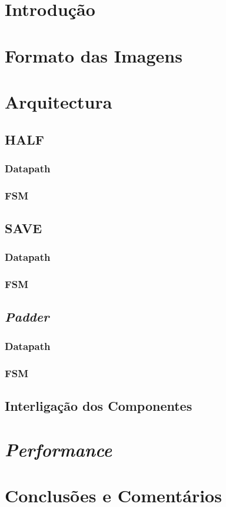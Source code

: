 \documentclass[a4paper]{article}
\begin{document}


\tableofcontents
\pagebreak

\section{Introdução}

\section{Formato das Imagens}

\section{Arquitectura}

\subsection{HALF}

\subsubsection{Datapath}

\subsubsection{FSM}

\subsection{SAVE}

\subsubsection{Datapath}

\subsubsection{FSM}

\subsection{\textit{Padder}}

\subsubsection{Datapath}

\subsubsection{FSM}

\subsection{Interligação dos Componentes}	%

\section{\textit{Performance}}	%

\section{Conclusões e Comentários}
\end{document}
